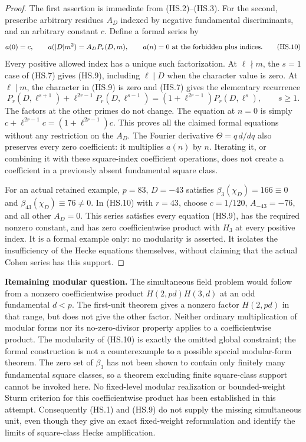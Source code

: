\documentclass[11pt,a4paper]{article}
\theoremstyle{definition}
\renewcommand{\paragraph}[1]{\par\smallskip\noindent\textbf{#1}\quad\ignorespaces}
\begin{document}
\begin{proof}
The first assertion is immediate from (HS.2)--(HS.3).
For the second, prescribe arbitrary residues $A_D$ indexed by
negative fundamental discriminants, and an arbitrary constant $c$.
Define a formal series by
\[
 a(0)=c,\qquad
 a(|D|m^2)=A_D P_r(D,m),
 \qquad a(n)=0\ \hbox{at the forbidden plus indices}.   \tag{HS.10}
\]
Every positive allowed index has a unique such factorization.
At $\ell\nmid m$, the $s=1$ case of (HS.7) gives (HS.9),
including $\ell\mid D$ when the character value is zero.
At $\ell\mid m$, the character in (HS.9) is zero and
(HS.7) gives the elementary recurrence
\[
 P_r(D,\ell^{s+1})+\ell^{2r-1}P_r(D,\ell^{s-1})
       =(1+\ell^{2r-1})P_r(D,\ell^s),\qquad s\geq1.
                                                               \tag{HS.11}
\]
The factors at the other primes do not change.
The equation at $n=0$ is simply
$c+\ell^{2r-1}c=(1+\ell^{2r-1})c$.
This proves all the claimed formal equations without any
restriction on the $A_D$.
The Fourier derivative $\Theta=q\,d/dq$ also preserves every
zero coefficient: it multiplies $a(n)$ by $n$.
Iterating it, or combining it with these square-index
coefficient operations, does not create a coefficient in a
previously absent fundamental square class.

For an actual retained example, $p=83$, $D=-43$ satisfies
$\beta_3(\chi_D)=166\equiv0$ and
$\beta_{43}(\chi_D)\equiv76\ne0$.
In (HS.10) with $r=43$, choose $c=1/120$,
$A_{-43}=-76$, and all other $A_D=0$.
This series satisfies every equation (HS.9), has the required
nonzero constant, and has zero coefficientwise product with
$H_3$ at every positive index.  It is a formal example only:
no modularity is asserted.  It isolates the insufficiency of
the Hecke equations themselves, without claiming that the
actual Cohen series has this support.
\end{proof}

\paragraph{Remaining modular question.}
The simultaneous field problem would follow from a nonzero
coefficientwise product
$H(2,pd)H(3,d)$ at an odd fundamental $d<p$.
The first-unit theorem gives a nonzero factor $H(2,pd)$ in that
range, but does not give the other factor.
Neither ordinary multiplication of modular forms nor its
no-zero-divisor property applies to a coefficientwise product.
The modularity of (HS.10) is exactly the omitted global constraint;
the formal construction is not a counterexample to a possible
special modular-form theorem.
The zero set of $\beta_3$ has not been shown to contain only
finitely many fundamental square classes, so a theorem excluding
finite square-class support cannot be invoked here.
No fixed-level modular realization or bounded-weight Sturm
criterion for this coefficientwise product has been established
in this attempt.  Consequently (HS.1) and (HS.9) do not supply
the missing simultaneous unit, even though they give an exact
fixed-weight reformulation and identify the limits of
square-class Hecke amplification.
\end{document}

